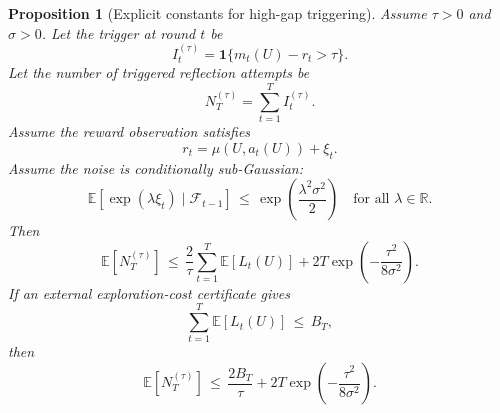 \documentclass{article} %
\newtheorem{proposition}[theorem]{Proposition}
\begin{document}
\begin{proposition}[Explicit constants for high-gap triggering]
\label{prop:12}
Assume \(\tau>0\) and \(\sigma>0\).
Let the trigger at round \(t\) be
\begin{equation}
\label{eq:app-fifth-trigger-def}
I_t^{(\tau)}
=
\mathbf{1}
\{m_t(U)-r_t>\tau\}.
\end{equation}
Let the number of triggered reflection attempts be
\begin{equation}
\label{eq:app-fifth-trigger-count}
N_T^{(\tau)}
=
\sum_{t=1}^{T} I_t^{(\tau)}.
\end{equation}
Assume the reward observation satisfies
\begin{equation}
\label{eq:app-fifth-reward-noise}
r_t
=
\mu(U,a_t(U))+\xi_t.
\end{equation}
Assume the noise is conditionally sub-Gaussian:
\begin{equation}
\label{eq:app-fifth-subg}
\mathbb{E}\!\left[
\exp(\lambda \xi_t)\mid \mathcal{F}_{t-1}
\right]
\,\le\,
\exp\!\left(\frac{\lambda^2\sigma^2}{2}\right)
\quad
\text{for all }\lambda\in\mathbb{R}.
\end{equation}
Then
\begin{equation}
\label{eq:app-fifth-trigger-bound}
\mathbb{E}\!\left[N_T^{(\tau)}\right]
\,\le\,
\frac{2}{\tau}
\sum_{t=1}^{T}\mathbb{E}[L_t(U)]
+
2T\exp\!\left(-\frac{\tau^2}{8\sigma^2}\right).
\end{equation}
If an external exploration-cost certificate gives
\begin{equation}
\label{eq:app-fifth-trigger-BT-assumption}
\sum_{t=1}^{T}\mathbb{E}[L_t(U)]
\,\le\,
B_T,
\end{equation}
then
\begin{equation}
\label{eq:app-fifth-trigger-BT}
\mathbb{E}\!\left[N_T^{(\tau)}\right]
\,\le\,
\frac{2B_T}{\tau}
+
2T\exp\!\left(-\frac{\tau^2}{8\sigma^2}\right).
\end{equation}
\end{proposition}
\end{document}
